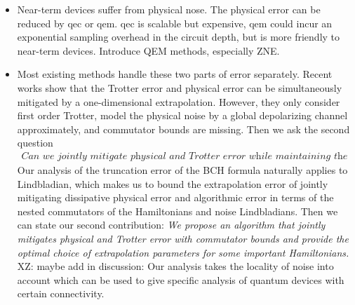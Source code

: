 \documentclass[11pt]{article}
\newcommand{\xz}[1]{{\color{cyan} XZ: #1}}
\begin{document}
\begin{itemize}
    \item Near-term devices suffer from physical nose. The physical error can be reduced by qec or qem. qec is scalable but expensive, qem could incur an exponential sampling overhead in the circuit depth, but is more friendly to near-term devices. Introduce QEM methods, especially ZNE. 
    \item Most existing methods handle these two parts of error separately. Recent works show that the Trotter error and physical error can be simultaneously mitigated by a one-dimensional extrapolation. However, they only consider first order Trotter, model the physical noise by a global depolarizing channel approximately, and commutator bounds are missing. Then we ask the second question \begin{align*}
        \textit{Can we jointly mitigate physical and Trotter error while maintaining the commutator bound?}
    \end{align*}Our analysis of the truncation error of the BCH formula naturally applies to Lindbladian, which makes us to bound the extrapolation error of jointly mitigating dissipative physical error and algorithmic error in terms of the nested commutators of the Hamiltonians and noise Lindbladians. Then we can state our second contribution: \emph{We propose an algorithm that jointly mitigates physical and Trotter error with commutator bounds and provide the optimal choice of extrapolation parameters for some important Hamiltonians.} \xz{maybe add in discussion: Our analysis takes the locality of noise into account which can be used to give specific analysis of quantum devices with certain connectivity. }
\end{itemize}
\end{document}
